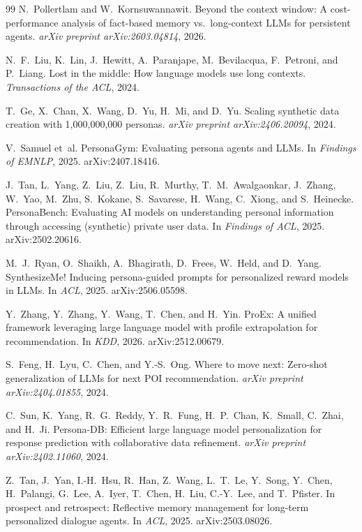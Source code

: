 \documentclass[sigconf,review,anonymous]{acmart}
\begin{document}
\begin{thebibliography}{99}
N.~Pollertlam and W.~Kornsuwannawit.
\newblock Beyond the context window: A cost-performance analysis of fact-based memory vs.\ long-context {LLMs} for persistent agents.
\newblock \textit{arXiv preprint arXiv:2603.04814}, 2026.

N.~F.~Liu, K.~Lin, J.~Hewitt, A.~Paranjape, M.~Bevilacqua, F.~Petroni, and P.~Liang.
\newblock Lost in the middle: How language models use long contexts.
\newblock \textit{Transactions of the ACL}, 2024.

T.~Ge, X.~Chan, X.~Wang, D.~Yu, H.~Mi, and D.~Yu.
\newblock Scaling synthetic data creation with 1,000,000,000 personas.
\newblock \textit{arXiv preprint arXiv:2406.20094}, 2024.

V.~Samuel et~al.
\newblock PersonaGym: Evaluating persona agents and {LLMs}.
\newblock In \textit{Findings of EMNLP}, 2025. arXiv:2407.18416.

J.~Tan, L.~Yang, Z.~Liu, Z.~Liu, R.~Murthy, T.~M.~Awalgaonkar, J.~Zhang, W.~Yao, M.~Zhu, S.~Kokane, S.~Savarese, H.~Wang, C.~Xiong, and S.~Heinecke.
\newblock PersonaBench: Evaluating {AI} models on understanding personal information through accessing (synthetic) private user data.
\newblock In \textit{Findings of ACL}, 2025. arXiv:2502.20616.

M.~J.~Ryan, O.~Shaikh, A.~Bhagirath, D.~Frees, W.~Held, and D.~Yang.
\newblock SynthesizeMe! Inducing persona-guided prompts for personalized reward models in {LLMs}.
\newblock In \textit{ACL}, 2025. arXiv:2506.05598.

Y.~Zhang, Y.~Zhang, Y.~Wang, T.~Chen, and H.~Yin.
\newblock ProEx: A unified framework leveraging large language model with profile extrapolation for recommendation.
\newblock In \textit{KDD}, 2026. arXiv:2512.00679.

S.~Feng, H.~Lyu, C.~Chen, and Y.-S.~Ong.
\newblock Where to move next: Zero-shot generalization of {LLMs} for next {POI} recommendation.
\newblock \textit{arXiv preprint arXiv:2404.01855}, 2024.

C.~Sun, K.~Yang, R.~G.~Reddy, Y.~R.~Fung, H.~P.~Chan, K.~Small, C.~Zhai, and H.~Ji.
\newblock Persona-DB: Efficient large language model personalization for response prediction with collaborative data refinement.
\newblock \textit{arXiv preprint arXiv:2402.11060}, 2024.

Z.~Tan, J.~Yan, I.-H.~Hsu, R.~Han, Z.~Wang, L.~T.~Le, Y.~Song, Y.~Chen, H.~Palangi, G.~Lee, A.~Iyer, T.~Chen, H.~Liu, C.-Y.~Lee, and T.~Pfister.
\newblock In prospect and retrospect: Reflective memory management for long-term personalized dialogue agents.
\newblock In \textit{ACL}, 2025. arXiv:2503.08026.


\end{thebibliography}
\end{document}
